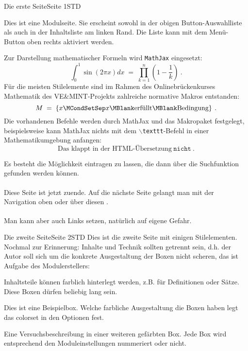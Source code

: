 \begin{MXContent}{Die erste Seite}{Seite 1}{STD}

Dies ist eine Modulseite. Sie erscheint sowohl in der obigen Button-Auswahlliste als auch in der
Inhaltsliste am linken Rand. Die Liste kann mit dem Menü-Button oben rechts aktiviert werden.

Zur Darstellung mathematischer Formeln wird \texttt{MathJax} eingesetzt:
$$
\int_0^1 \sin(2\pi x)dx \;=\; \prod_{k=1}^n \left({1-\frac1k}\right)\: .
$$
Für die meisten Stilelemente sind im Rahmen des Onlinebrückenkurses Mathematik des VE\&MINT-Projekts zahlreiche
normative Makros entstanden:
$$
M \;=\;\left\lbrace{x\MCondSetSep x\MBlank\text{erfüllt}\MBlank \text{Bedingung}}\right\rbrace\: .
$$
Die vorhandenen Befehle werden durch MathJax und das Makropaket festgelegt, beispielsweise kann MathJax nichts
mit dem \texttt{$\backslash$texttt}-Befehl in einer Mathematikumgebung anfangen:
$$
\text{Das klappt in der HTML-Übersetzung}\ \texttt{nicht}\: .
$$

Es besteht die Möglichkeit  eintragen zu lassen, die dann über die Suchfunktion gefunden werden können.
\ \\ \ \\
Diese Seite ist jetzt zuende. Auf die nächste Seite gelangt man mit der Navigation oben oder über diesen .
\ \\ \ \\
Man kann aber auch Links  setzen, natürlich auf eigene Gefahr.
\end{MXContent}

\begin{MXContent}{Die zweite Seite}{Seite 2}{STD}
Dies ist die zweite Seite mit einigen Stilelementen. Nochmal zur Erinnerung: Inhalte und Technik sollten getrennt sein,
d.h. der Autor soll sich um die konkrete Ausgestaltung der Boxen nicht scheren, das ist Aufgabe des Modulerstellers:

\begin{MInfo}
Inhaltsteile können farblich hinterlegt werden, z.B. für Definitionen oder Sätze. Diese Boxen dürfen beliebig lang sein.
\end{MInfo}

\begin{MExample}
Dies ist eine Beispielbox. Welche farbliche Ausgestaltung die Boxen haben legt das colorset in den Optionen fest.
\end{MExample}

\begin{MExperiment}
Eine Versuchsbeschreibung in einer weiteren gefärbten Box.
Jede Box wird entsprechend den Moduleinstellungen nummeriert oder nicht.
\end{MExperiment}

\end{MXContent}

